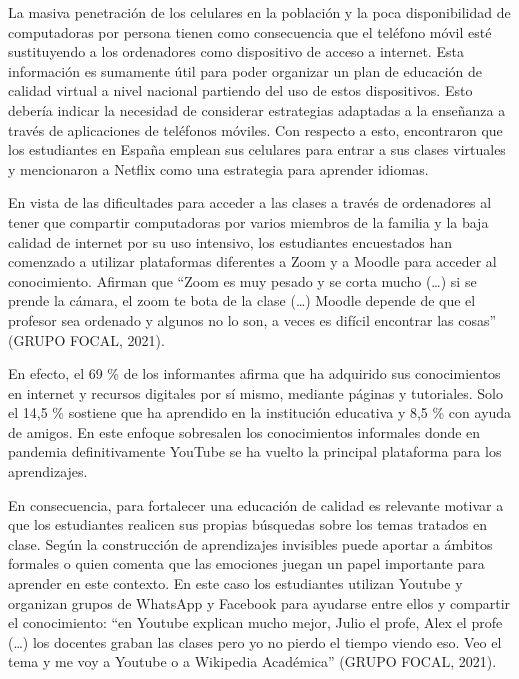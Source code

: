 \documentclass[spanish]{textolivre}
\begin{document}
La masiva penetración de los celulares en la población y la poca disponibilidad de computadoras por persona tienen como consecuencia que el teléfono móvil esté sustituyendo a los ordenadores como dispositivo de acceso a internet. Esta información es sumamente útil para poder organizar un plan de educación de calidad virtual a nivel nacional partiendo del uso de estos dispositivos. Esto debería indicar la necesidad de considerar estrategias adaptadas a la enseñanza a través de aplicaciones de teléfonos móviles. Con respecto a esto, \textcite{martinez_uso_2020} encontraron que los estudiantes en España emplean sus celulares para entrar a sus clases virtuales y mencionaron a Netflix como una estrategia para aprender idiomas.

En vista de las dificultades para acceder a las clases a través de ordenadores al tener que compartir computadoras por varios miembros de la familia y la baja calidad de internet por su uso intensivo, los estudiantes encuestados han comenzado a utilizar plataformas diferentes a Zoom y a Moodle para acceder al conocimiento. Afirman que “Zoom es muy pesado y se corta mucho (…) si se prende la cámara, el zoom te bota de la clase (…) Moodle depende de que el profesor sea ordenado y algunos no lo son, a veces es difícil encontrar las cosas” (GRUPO FOCAL, 2021). 

En efecto, el 69 \% de los informantes afirma que ha adquirido sus conocimientos en internet y recursos digitales por sí mismo, mediante páginas y tutoriales. Solo el 14,5 \% sostiene que ha aprendido en la institución educativa y 8,5 \% con ayuda de amigos. En este enfoque sobresalen los conocimientos informales donde en pandemia definitivamente YouTube se ha vuelto la principal plataforma para los aprendizajes. 

En consecuencia, para fortalecer una educación de calidad es relevante motivar a que los estudiantes realicen sus propias búsquedas sobre los temas tratados en clase. Según \textcite{cobo_aprendizaje_2011} la construcción de aprendizajes invisibles puede aportar a ámbitos formales o \textcite{mendoza_castillo_lo_2020} quien comenta que las emociones juegan un papel importante para aprender en este contexto. En este caso los estudiantes utilizan Youtube y organizan grupos de WhatsApp y Facebook para ayudarse entre ellos y compartir el conocimiento: “en Youtube explican mucho mejor, Julio el profe, Alex el profe (…) los docentes graban las clases pero yo no pierdo el tiempo viendo eso. Veo el tema y me voy a Youtube o a Wikipedia Académica” (GRUPO FOCAL, 2021).
\end{document}
